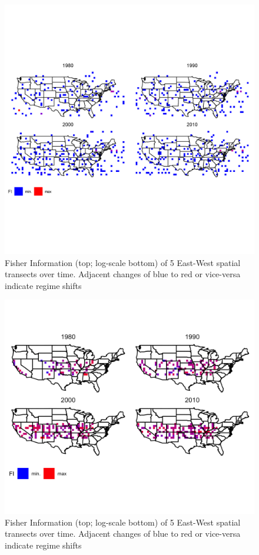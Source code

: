 \documentclass[12pt,twoside,openany]{reedthesis}
\begin{document}
\begin{figure}
\includegraphics[width=0.95\linewidth]{./chapterFiles/fisherSpatial/figures/figsCalledInDiss/usaAllTsects_East-West_metric_FI} \caption{Fisher Information (top; log-scale bottom) of 5 East-West spatial transects over time. Adjacent changes of blue to red or vice-versa indicate regime shifts}\label{fig:usaFI}
\end{figure}\begin{figure}
\includegraphics[width=0.95\linewidth]{./chapterFiles/fisherSpatial/figures/figsCalledInDiss/usaAllTsects_East-West_metric_logScaleFI} \caption{Fisher Information (top; log-scale bottom) of 5 East-West spatial transects over time. Adjacent changes of blue to red or vice-versa indicate regime shifts}\label{fig:usaFI}
\end{figure}
\end{document}
